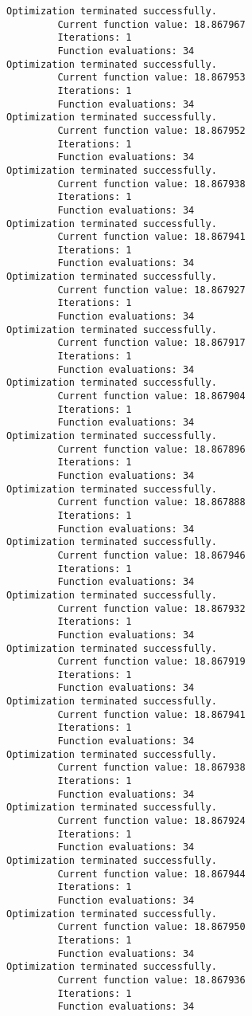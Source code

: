 \documentclass[11pt]{article}
\begin{document}
\begin{Verbatim}[commandchars=\\\{\}]
Optimization terminated successfully.
         Current function value: 18.867967
         Iterations: 1
         Function evaluations: 34
Optimization terminated successfully.
         Current function value: 18.867953
         Iterations: 1
         Function evaluations: 34
Optimization terminated successfully.
         Current function value: 18.867952
         Iterations: 1
         Function evaluations: 34
Optimization terminated successfully.
         Current function value: 18.867938
         Iterations: 1
         Function evaluations: 34
Optimization terminated successfully.
         Current function value: 18.867941
         Iterations: 1
         Function evaluations: 34
Optimization terminated successfully.
         Current function value: 18.867927
         Iterations: 1
         Function evaluations: 34
Optimization terminated successfully.
         Current function value: 18.867917
         Iterations: 1
         Function evaluations: 34
Optimization terminated successfully.
         Current function value: 18.867904
         Iterations: 1
         Function evaluations: 34
Optimization terminated successfully.
         Current function value: 18.867896
         Iterations: 1
         Function evaluations: 34
Optimization terminated successfully.
         Current function value: 18.867888
         Iterations: 1
         Function evaluations: 34
Optimization terminated successfully.
         Current function value: 18.867946
         Iterations: 1
         Function evaluations: 34
Optimization terminated successfully.
         Current function value: 18.867932
         Iterations: 1
         Function evaluations: 34
Optimization terminated successfully.
         Current function value: 18.867919
         Iterations: 1
         Function evaluations: 34
Optimization terminated successfully.
         Current function value: 18.867941
         Iterations: 1
         Function evaluations: 34
Optimization terminated successfully.
         Current function value: 18.867938
         Iterations: 1
         Function evaluations: 34
Optimization terminated successfully.
         Current function value: 18.867924
         Iterations: 1
         Function evaluations: 34
Optimization terminated successfully.
         Current function value: 18.867944
         Iterations: 1
         Function evaluations: 34
Optimization terminated successfully.
         Current function value: 18.867950
         Iterations: 1
         Function evaluations: 34
Optimization terminated successfully.
         Current function value: 18.867936
         Iterations: 1
         Function evaluations: 34

\end{Verbatim}
\end{document}
